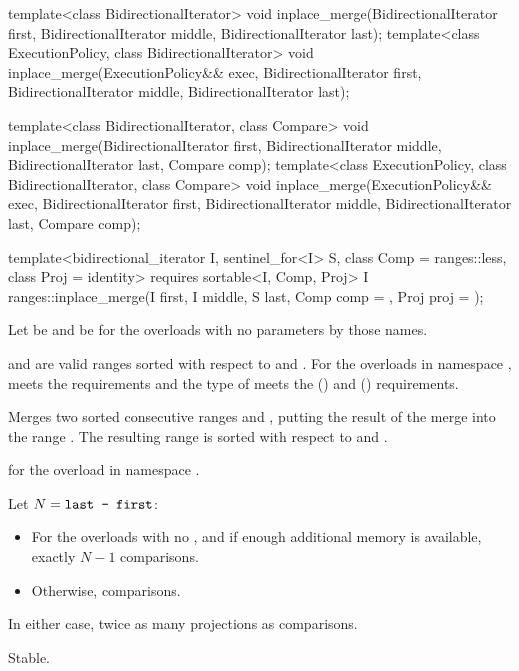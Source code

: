 %
\begin{itemdecl}
template<class BidirectionalIterator>
  void inplace_merge(BidirectionalIterator first,
                     BidirectionalIterator middle,
                     BidirectionalIterator last);
template<class ExecutionPolicy, class BidirectionalIterator>
  void inplace_merge(ExecutionPolicy&& exec,
                     BidirectionalIterator first,
                     BidirectionalIterator middle,
                     BidirectionalIterator last);

template<class BidirectionalIterator, class Compare>
  void inplace_merge(BidirectionalIterator first,
                     BidirectionalIterator middle,
                     BidirectionalIterator last, Compare comp);
template<class ExecutionPolicy, class BidirectionalIterator, class Compare>
  void inplace_merge(ExecutionPolicy&& exec,
                     BidirectionalIterator first,
                     BidirectionalIterator middle,
                     BidirectionalIterator last, Compare comp);

template<bidirectional_iterator I, sentinel_for<I> S, class Comp = ranges::less,
         class Proj = identity>
  requires sortable<I, Comp, Proj>
  I ranges::inplace_merge(I first, I middle, S last, Comp comp = {}, Proj proj = {});
\end{itemdecl}

\begin{itemdescr}
\pnum
Let  be 
and  be 
for the overloads with no parameters by those names.

\pnum
\expects
{} and  are valid ranges
sorted with respect to  and .
For the overloads in namespace ,
 meets
the  requirements and
the type of  meets
the  () and
 () requirements.

\pnum
\effects
Merges two sorted consecutive ranges
 and ,
putting the result of the merge into the range .
The resulting range is sorted with respect to  and .

\pnum
\returns
{} for the overload in namespace .

\pnum
\complexity
Let $N = \texttt{last - first}$:
\begin{itemize}
\item
  For the overloads with no , and
  if enough additional memory is available, exactly $N - 1$ comparisons.
\item
  Otherwise,  comparisons.
\end{itemize}
In either case, twice as many projections as comparisons.

\pnum
\remarks
Stable.
\end{itemdescr}

